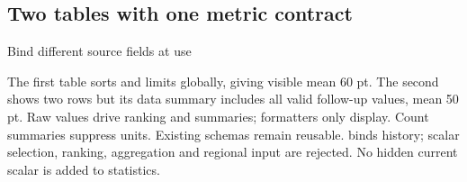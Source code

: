 \subsection{Two tables with one metric contract}
\begin{demo}{Bind different source fields at use}
\begingroup
{}
\begin{gradtable}[data=reviews,style=metric-report,
 width=\linewidth,sort=score,order=descending,limit=2]
\end{gradtable}\par\medskip
\begin{gradtable}[data=reviews,style=metric-report,
 width=\linewidth,limit=2]
\end{gradtable}
\endgroup
\end{demo}
The first table sorts and limits globally, giving visible mean 60 pt. The second shows two rows but its data summary includes all valid follow-up values, mean 50 pt. Raw values drive ranking and summaries; formatters only display. Count summaries suppress units. Existing schemas remain reusable.  binds history; scalar selection, ranking, aggregation and regional input are rejected. No hidden current scalar is added to statistics.
\clearpage
